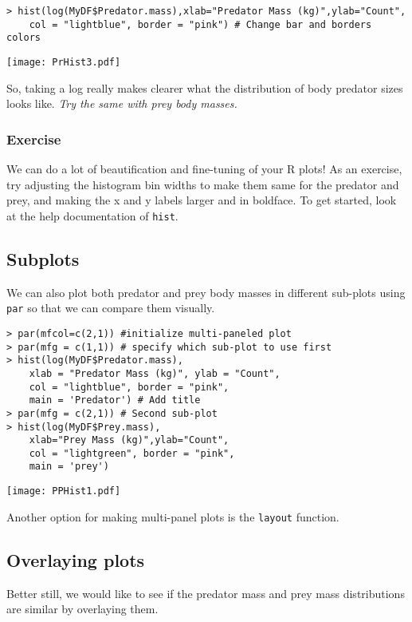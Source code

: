 \begin{lstlisting}
> hist(log(MyDF$Predator.mass),xlab="Predator Mass (kg)",ylab="Count", 
    col = "lightblue", border = "pink") # Change bar and borders colors 
\end{lstlisting}
\begin{center}
   \texttt{[image: PrHist3.pdf]} 
\end{center}

So, taking a log really makes clearer what the distribution of body 
predator sizes looks like. {\it Try the same with prey body masses.}

\subsubsection{Exercise}

We can do a lot of beautification and fine-tuning of your R plots! As 
an exercise, try adjusting the histogram bin widths to make them same 
for the predator and prey, and making the x and y labels larger and in 
boldface. To get started, look at the help documentation of {\tt hist}.

\subsection{Subplots}
We can also plot both predator and prey body masses in different 
sub-plots using {\tt par} so that we can compare them visually. 

\begin{lstlisting}
> par(mfcol=c(2,1)) #initialize multi-paneled plot
> par(mfg = c(1,1)) # specify which sub-plot to use first 
> hist(log(MyDF$Predator.mass),
    xlab = "Predator Mass (kg)", ylab = "Count", 
    col = "lightblue", border = "pink", 
    main = 'Predator') # Add title
> par(mfg = c(2,1)) # Second sub-plot
> hist(log(MyDF$Prey.mass),
    xlab="Prey Mass (kg)",ylab="Count", 
    col = "lightgreen", border = "pink", 
    main = 'prey')
\end{lstlisting}
\begin{center}
   \texttt{[image: PPHist1.pdf]} 
\end{center}

Another option for making multi-panel plots is the {\tt layout} 
function. 

\subsection{Overlaying plots}
Better still, we would like to see if the predator mass and prey mass 
distributions are similar by overlaying them. 

